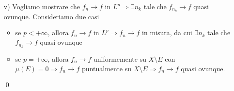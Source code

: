 \begin{enumerate}
	\item[v)] Vogliamo mostrare che $f_n \to f$ in $L^p \Longrightarrow \exists n_k$ tale che $f_{n_k} \to f$ quasi ovunque. Consideriamo due casi
	\begin{itemize}

		\item se $p < +\infty$, allora $f_n \to f$ in $L^p \Longrightarrow f_n \to f$ in misura, da cui $\exists n_k$ tale che $f_{n_k} \to f$ quasi ovunque

		\item se $p=+\infty$, allora $f_n \to f$ uniformemente su $X \setminus E$ con $\mu(E) = 0 \Longrightarrow f_n \to f$ puntualmente su $X \setminus E \Longrightarrow f_n \to f$ quasi ovunque.

	\end{itemize}
	\qed

\end{enumerate}
